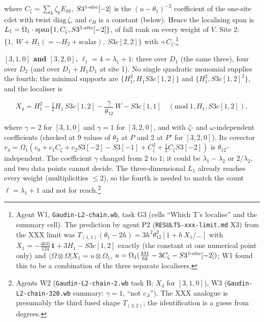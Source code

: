 \documentclass[11pt]{article}
\begin{document}
where $C_\zeta=\sum_k\zeta_kE_{kk}$, $S3^{\rm 1\text{-}site}[-2]$ is the $(u-\theta_1)^{-2}$ coefficient of the one-site cdet with twist $\mathrm{diag}\,\zeta$, and $c_H$ is a constant (below).
Hence the localising span is $L_1=\Omega_1\cdot\mathrm{span}\{1,C_\zeta,S3^{\rm 1\text{-}site}[-2]\}$, of full rank on every weight of $V$. Site 2: $\{1,\ W+H_1(=-H_2+\text{scalar}),\ S3c[2,2]\}$ with $+C_\zeta$.\footnote{Agent W1, \texttt{Gaudin-\allowbreak{}L2-\allowbreak{}chain.\allowbreak{}wb}, task G3 (cells ``Which T's localise'' and the summary cell).
The prediction by agent P2 (\texttt{RESULTS-\allowbreak{}xxx-\allowbreak{}limit.\allowbreak{}md} X3) from the XXX limit was $T_{(1,1)}(\theta_1-2h)=3h^2\theta_{12}^2[1+h\,X_1/\ldots]$ with $X_1=-\tfrac{4631}{124}\mathbf 1+3H_1-S3c[1,2]$ exactly (the constant at one numerical point only) and $\langle\Omega\otimes\Omega|X_1=u\otimes\Omega_1$, $u=\Omega_1(\tfrac{431}{62}-3C_\zeta-S3^{\rm 1\text{-}site}[-2])$; W1 found this to be a combination of the three separate localisers.}

\textbf{$[3,1,0]$ and $[3,2,0]$.} $\ell_1=4=\lambda_1+1$: three over $D_1$ (the same three), four over $D_2$ (and over $D_1+H_1D_1$ at site 1).
No single quadratic monomial supplies the fourth; the minimal supports are $\{H_1^2,H_1S3c[1,2]\}$ and $\{H_1^2,S3c[1,2]^2\}$, and the localiser is

\begin{equation}
X_4=H_1^2-\tfrac12H_1\,S3c[1,2]-\frac{\gamma}{\theta_{12}}\,W-S3c[1,1]\quad(\mathrm{mod}\ 1,H_1,S3c[1,2]),\label{eq:X4}
\end{equation}

where $\gamma=2$ for $[3,1,0]$ and $\gamma=1$ for $[3,2,0]$, and with $\zeta$- and $\omega$-independent coefficients (checked at 9 values of $\theta_2$ at $P$ and 2 at $P'$ for $[3,2,0]$).
Its covector $v_4=\Omega_1(c_0+c_1C_\zeta+c_2S3[-2]-S3[-1]+C_\zeta^2+\tfrac12C_\zeta S3[-2])$ is $\theta_{12}$-independent.
The coefficient $\gamma$ changed from $2$ to $1$; it could be $\lambda_1-\lambda_2$ or $2/\lambda_2$, and two data points cannot decide.
The three-dimensional $L_1$ already reaches every weight (multiplicities $\le2$), so the fourth is needed to match the count $\ell=\lambda_1+1$ and not for reach.\footnote{Agents W2 (\texttt{Gaudin-\allowbreak{}L2-\allowbreak{}chain-\allowbreak{}2.\allowbreak{}wb} task B; $X_4$ for $[3,1,0]$), W3 (\texttt{Gaudin-\allowbreak{}L2-\allowbreak{}chain-\allowbreak{}320.\allowbreak{}wb} summary: $\gamma=1$, ``not $c_\Lambda$'').
The XXX analogue is presumably the third fused shape $T_{(3,2)}$; the identification is a guess from degrees.}
\end{document}
